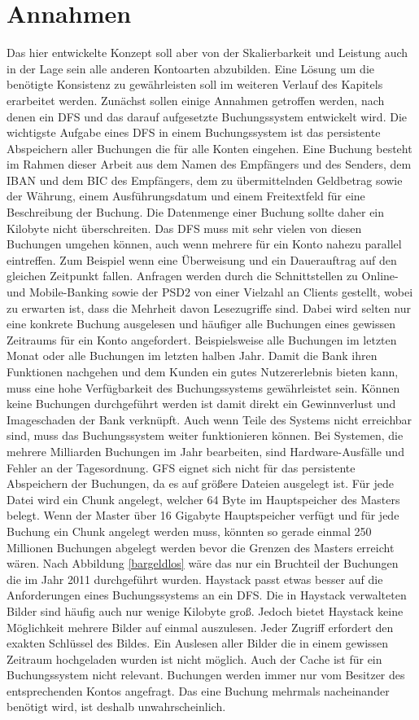 \documentclass[12pt,oneside,a4paper,parskip]{scrbook}
\begin{document}
\section{Annahmen}
Das hier entwickelte Konzept soll aber von der Skalierbarkeit und Leistung auch in der Lage sein alle anderen Kontoarten abzubilden. Eine Lösung um die benötigte Konsistenz zu gewährleisten soll im weiteren Verlauf des Kapitels erarbeitet werden. Zunächst sollen einige Annahmen getroffen werden, nach denen ein DFS und das darauf aufgesetzte Buchungssystem entwickelt wird. Die wichtigste Aufgabe eines DFS in einem Buchungssystem ist das persistente Abspeichern aller Buchungen die für alle Konten eingehen. Eine Buchung besteht im Rahmen dieser Arbeit aus dem Namen des Empfängers und des Senders, dem IBAN und dem BIC des Empfängers, dem zu übermittelnden Geldbetrag sowie der Währung, einem Ausführungsdatum und einem Freitextfeld für eine Beschreibung der Buchung. Die Datenmenge einer Buchung sollte daher ein Kilobyte nicht überschreiten. Das DFS muss mit sehr vielen von diesen Buchungen umgehen können, auch wenn mehrere für ein Konto nahezu parallel eintreffen. Zum Beispiel wenn eine Überweisung und ein Dauerauftrag auf den gleichen Zeitpunkt fallen. Anfragen werden durch die Schnittstellen zu Online- und Mobile-Banking sowie der PSD2 von einer Vielzahl an Clients gestellt, wobei zu erwarten ist, dass die Mehrheit davon Lesezugriffe sind. Dabei wird selten nur eine konkrete Buchung ausgelesen und häufiger alle Buchungen eines gewissen Zeitraums für ein Konto angefordert. Beispielsweise alle Buchungen im letzten Monat oder alle Buchungen im letzten halben Jahr. Damit die Bank ihren Funktionen nachgehen und dem Kunden ein gutes Nutzererlebnis bieten kann, muss eine hohe Verfügbarkeit des Buchungssystems gewährleistet sein. Können keine Buchungen durchgeführt werden ist damit direkt ein Gewinnverlust und Imageschaden der Bank verknüpft. Auch wenn Teile des Systems nicht erreichbar sind, muss das Buchungssystem weiter funktionieren können. Bei Systemen, die mehrere Milliarden Buchungen im Jahr bearbeiten, sind Hardware-Ausfälle und Fehler an der Tagesordnung. 
GFS eignet sich nicht für das persistente Abspeichern der Buchungen, da es auf größere Dateien ausgelegt ist. Für jede Datei wird ein Chunk angelegt, welcher 64 Byte im Hauptspeicher des Masters belegt. Wenn der Master über 16 Gigabyte Hauptspeicher verfügt und für jede Buchung ein Chunk angelegt werden muss, könnten so gerade einmal 250 Millionen Buchungen abgelegt werden bevor die Grenzen des Masters erreicht wären. Nach Abbildung \ref{bargeldlos} wäre das nur ein Bruchteil der Buchungen die im Jahr 2011 durchgeführt wurden. Haystack passt etwas besser auf die Anforderungen eines Buchungssystems an ein DFS. Die in Haystack verwalteten Bilder sind häufig auch nur wenige Kilobyte groß. Jedoch bietet Haystack keine Möglichkeit mehrere Bilder auf einmal auszulesen. Jeder Zugriff erfordert den exakten Schlüssel des Bildes. Ein Auslesen aller Bilder die in einem gewissen Zeitraum hochgeladen wurden ist nicht möglich. Auch der Cache ist für ein Buchungssystem nicht relevant. Buchungen werden immer nur vom Besitzer des entsprechenden Kontos angefragt. Das eine Buchung mehrmals nacheinander benötigt wird, ist deshalb unwahrscheinlich.
\end{document}
